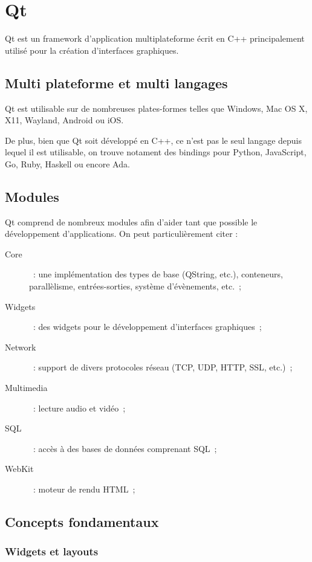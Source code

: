 \section{Qt}

Qt est un framework d'application multiplateforme écrit en C++ principalement utilisé pour la création d'interfaces graphiques.

\subsection{Multi plateforme et multi langages}

Qt est utilisable sur de nombreuses plates-formes telles que Windows, Mac OS X, X11, Wayland, Android ou iOS.

De plus, bien que Qt soit développé en C++, ce n'est pas le seul langage depuis lequel il est utilisable, on trouve notament des bindings pour Python, JavaScript, Go, Ruby, Haskell ou encore Ada.

\subsection{Modules}

Qt comprend de nombreux modules afin d'aider tant que possible le développement d'applications.
On peut particulièrement citer :
\begin{description}
	\item[Core]~: une implémentation des types de base (QString, etc.), conteneurs, parallèlisme, entrées-sorties, système d'évènements, etc.~;
	\item[Widgets]~: des widgets pour le développement d'interfaces graphiques~;
	\item[Network]~: support de divers protocoles réseau (TCP, UDP, HTTP, SSL, etc.)~;
	\item[Multimedia]~: lecture audio et vidéo~;
	\item[SQL]~: accès à des bases de données comprenant SQL~;
	\item[WebKit]~: moteur de rendu HTML~;
\end{description}

\subsection{Concepts fondamentaux}

\subsubsection{Widgets et layouts}


